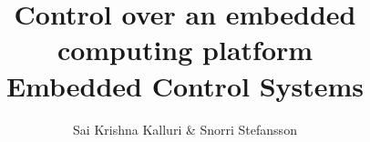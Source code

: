 \documentclass{article}
\begin{document}
\title{ {\fontsize{16}{1} \selectfont Control over an embedded computing platform} {\\ \fontsize{13}{1} \selectfont \textbf{Embedded Control Systems}} }
\author{Sai Krishna Kalluri \& Snorri Stefansson }

\maketitle










\printbibliography
\end{document}
